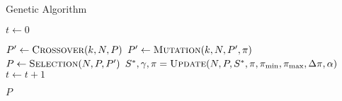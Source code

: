 \begin{algorithm}[t]
  \caption{Genetic Algorithm}\label{alg:GENETIKUS_ALGORITMUS}
  \begin{algorithmic}[1]
    \State $t \leftarrow 0$
    \State {}

    \State $P' \leftarrow \Call{Crossover}{k, N, P}$
    \State $P' \leftarrow \Call{Mutation}{k, N, P', \pi}$
    \State $P \leftarrow \Call{Selection}{N, P, P'}$
    \State $S^{*}, \gamma, \pi = \Call{Update}{N, P, S^{*}, \pi, \pi_{\min}, \pi_{\max}, \Delta \pi, \alpha}$
    \State $t \leftarrow t + 1$
    \EndWhile

    \State \Return $P$
    \EndFunction
  \end{algorithmic}
\end{algorithm}
